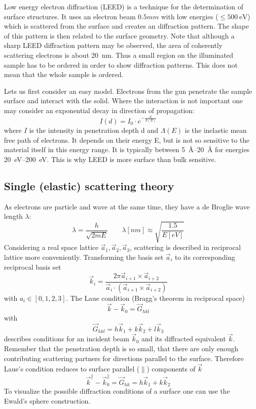 Low energy electron diffraction (LEED) is a technique for the determination of surface structures. It uses an electron beam $0.5mm$ with low energies ($\leq \SI{500}{\eV}$) which is scattered from the surface and creates an diffraction pattern. The shape of this pattern is then related to the surface geometry. Note that although a sharp LEED diffraction pattern may be observed, the area of coherently scattering electrons is about \SI{20}{\nm}. Thus a small region on the illuminated sample has to be ordered in order to show diffraction patterns. This does not mean that the whole sample is ordered.


Lets us first consider an easy model. Electrons from the gun penetrate the sample surface and interact with the solid. Where the interaction is not important one may consider an exponential decay in direction of propagation:
$$I(d)=I_0\cdot e^{-\frac{d}{\Lambda(E)}}$$ where $I$ is the intensity in penetration depth d and $\Lambda(E)$ is the inelastic mean free path of electrons. It depends on their energy E, but is not so sensitive to the material itself in this energy range. It is typically between \SIrange{5}{20}{\angstrom} for energies \SIrange{20}{200}{\eV}. This is why LEED is more surface than bulk sensitive.

\subsection{Single (elastic) scattering theory}
As electrons are particle and wave at the same time, they have a  de Broglie wave length $\lambda$:
$$\lambda=\frac{h}{\sqrt{2mE}} \qquad \lambda[nm] \approx \sqrt{\frac{1.5}{E[eV]}}$$
Considering a real space lattice {$\vec a_1,\vec a_2,\vec a_3$}, scattering is described in reciprocal lattice more conveniently. Transforming the basis set $\vec a_i$ to its corresponding reciprocal basis set 
$$\vec k_i=\frac{2\pi \vec a_{i+1}\times\vec a_{i+2}}{\vec a_i\cdot(\vec a_{i+1}\times \vec a_{i+2})}$$ with $a_i \in [0,1,2,3]$.
The Laue condition (Bragg's theorem in reciprocal space) $$\vec k-\vec k_0 = \vec G_{hkl}$$ with $$\vec G_{hkl}=h\vec k_1+k\vec k_2+l\vec k_3$$ describes conditions for an incident beam $\vec k_0$ and its diffracted equivalent $\vec k$. Remember that the penetration depth is so small, that there are only enough contributing scattering partners for directions parallel to the surface. Therefore Laue's condition reduces to surface parallel ($\parallel$) components of $\vec k$ $$\vec k^{\parallel}-\vec k^{\parallel}_0=\vec G_{hk}=h\vec k_1 + k \vec k_2$$ To visualize the possible diffraction conditions of a surface one can use the Ewald's sphere construction.
